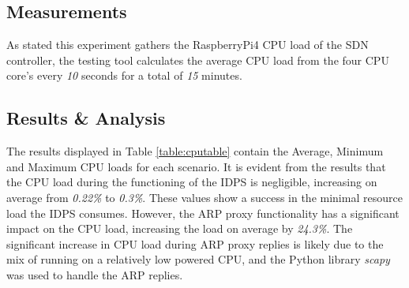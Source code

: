 \documentclass[12pt, oneside]{book}
\begin{document}
\subsection{Measurements}
As stated this experiment gathers the RaspberryPi4 CPU load of the SDN controller,
the testing tool calculates the average CPU load from the four CPU core's every \emph{10} seconds for a total of \emph{15} minutes.

\subsection{Results \& Analysis}
\label{subsec:cpuload}
The results displayed in Table \ref{table:cputable} contain the Average, Minimum and Maximum CPU loads for each scenario.
It is evident from the results that the CPU load during the functioning of the IDPS is negligible, increasing on average
from \emph{0.22\%} to \emph{0.3\%}. These values show a success in the minimal resource load the IDPS consumes.
However, the ARP proxy functionality has a significant impact on the CPU load, increasing the load on average by 
\emph{24.3\%}. The significant increase in CPU load during ARP proxy replies
is likely due to the mix of running on a relatively low powered CPU, and the 
Python library \emph{scapy} was used to handle the ARP replies.
\end{document}

